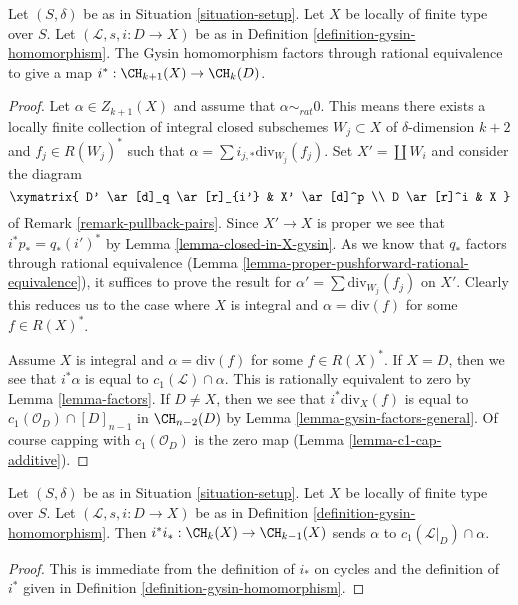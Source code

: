 \begin{lemma}
\label{lemma-gysin-factors}
Let $(S, \delta)$ be as in Situation \ref{situation-setup}.
Let $X$ be locally of finite type over $S$.
Let $(\mathcal{L}, s, i : D \to X)$ be as in
Definition \ref{definition-gysin-homomorphism}.
The Gysin homomorphism factors through rational equivalence to
give a map $i^* : \CH_{k + 1}(X) \to \CH_k(D)$.
\end{lemma}

\begin{proof}
Let $\alpha \in Z_{k + 1}(X)$ and assume that $\alpha \sim_{rat} 0$.
This means there exists a locally finite collection of integral
closed subschemes $W_j \subset X$ of $\delta$-dimension $k + 2$
and $f_j \in R(W_j)^*$ such that
$\alpha = \sum i_{j, *}\text{div}_{W_j}(f_j)$.
Set $X' = \coprod W_i$ and consider the diagram
$$
\xymatrix{
D' \ar[d]_q \ar[r]_{i'} & X' \ar[d]^p \\
D \ar[r]^i & X
}
$$
of Remark \ref{remark-pullback-pairs}. Since $X' \to X$ is proper
we see that $i^*p_* = q_*(i')^*$ by Lemma \ref{lemma-closed-in-X-gysin}.
As we know that $q_*$ factors through rational equivalence
(Lemma \ref{lemma-proper-pushforward-rational-equivalence}), it suffices
to prove the result for $\alpha' = \sum \text{div}_{W_j}(f_j)$
on $X'$. Clearly this reduces us to the case where $X$ is integral
and $\alpha = \text{div}(f)$ for some $f \in R(X)^*$.

\medskip\noindent
Assume $X$ is integral and $\alpha = \text{div}(f)$ for some $f \in R(X)^*$.
If $X = D$, then we see that $i^*\alpha$ is equal
to $c_1(\mathcal{L}) \cap \alpha$.
This is rationally equivalent to zero by Lemma \ref{lemma-factors}.
If $D \not = X$, then we see that $i^*\text{div}_X(f)$ is equal to
$c_1(\mathcal{O}_D) \cap [D]_{n - 1}$ in $\CH_{n - 2}(D)$ by
Lemma \ref{lemma-gysin-factors-general}. Of course
capping with $c_1(\mathcal{O}_D)$ is the zero map
(Lemma \ref{lemma-c1-cap-additive}).
\end{proof}

\begin{lemma}
\label{lemma-gysin-back}
Let $(S, \delta)$ be as in Situation \ref{situation-setup}. Let $X$ be locally
of finite type over $S$. Let $(\mathcal{L}, s, i : D \to X)$ be as in
Definition \ref{definition-gysin-homomorphism}. Then
$i^*i_* : \CH_k(X) \to \CH_{k - 1}(X)$ sends $\alpha$ to
$c_1(\mathcal{L}|_D) \cap \alpha$.
\end{lemma}

\begin{proof}
This is immediate from the definition of $i_*$ on cycles
and the definition of $i^*$ given in
Definition \ref{definition-gysin-homomorphism}.
\end{proof}


